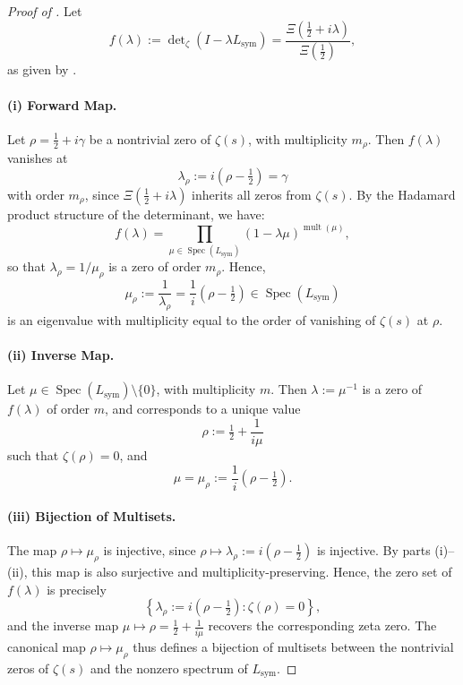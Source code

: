 \begin{proof}[Proof of ]
Let
\[
f(\lambda) := \det\nolimits_\zeta(I - \lambda L_{\mathrm{sym}}) = \frac{\Xi(\tfrac{1}{2} + i\lambda)}{\Xi(\tfrac{1}{2})},
\]
as given by .

\paragraph{(i) Forward Map.}
Let \( \rho = \tfrac{1}{2} + i\gamma \) be a nontrivial zero of \( \zeta(s) \), with multiplicity \( m_\rho \). Then \( f(\lambda) \) vanishes at
\[
\lambda_\rho := i(\rho - \tfrac{1}{2}) = \gamma
\]
with order \( m_\rho \), since \( \Xi(\tfrac{1}{2} + i\lambda) \) inherits all zeros from \( \zeta(s) \). By the Hadamard product structure of the determinant, we have:
\[
f(\lambda) = \prod_{\mu \in \operatorname{Spec}(L_{\mathrm{sym}})} (1 - \lambda \mu)^{\operatorname{mult}(\mu)},
\]
so that \( \lambda_\rho = 1/\mu_\rho \) is a zero of order \( m_\rho \). Hence,
\[
\mu_\rho := \frac{1}{\lambda_\rho} = \frac{1}{i}(\rho - \tfrac{1}{2}) \in \operatorname{Spec}(L_{\mathrm{sym}})
\]
is an eigenvalue with multiplicity equal to the order of vanishing of \( \zeta(s) \) at \( \rho \).

\paragraph{(ii) Inverse Map.}
Let \( \mu \in \operatorname{Spec}(L_{\mathrm{sym}}) \setminus \{0\} \), with multiplicity \( m \). Then \( \lambda := \mu^{-1} \) is a zero of \( f(\lambda) \) of order \( m \), and corresponds to a unique value
\[
\rho := \tfrac{1}{2} + \frac{1}{i\mu}
\]
such that \( \zeta(\rho) = 0 \), and
\[
\mu = \mu_\rho := \frac{1}{i}(\rho - \tfrac{1}{2}).
\]

\paragraph{(iii) Bijection of Multisets.}
The map \( \rho \mapsto \mu_\rho \) is injective, since \( \rho \mapsto \lambda_\rho := i(\rho - \tfrac{1}{2}) \) is injective. By parts (i)–(ii), this map is also surjective and multiplicity-preserving. Hence, the zero set of \( f(\lambda) \) is precisely
\[
\left\{ \lambda_\rho := i(\rho - \tfrac{1}{2}) : \zeta(\rho) = 0 \right\},
\]
and the inverse map \( \mu \mapsto \rho = \tfrac{1}{2} + \frac{1}{i\mu} \) recovers the corresponding zeta zero. The canonical map \( \rho \mapsto \mu_\rho \) thus defines a bijection of multisets between the nontrivial zeros of \( \zeta(s) \) and the nonzero spectrum of \( L_{\mathrm{sym}} \).
\end{proof}
